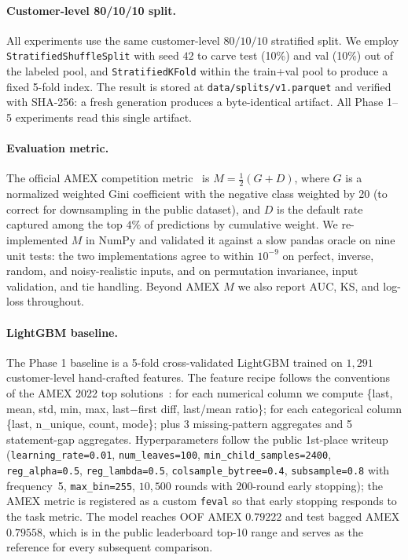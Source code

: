 \documentclass[sigconf, anonymous, review]{acmart}
\begin{document}
\paragraph{Customer-level 80/10/10 split.}
All experiments use the same customer-level $80/10/10$ stratified
split. We employ \texttt{StratifiedShuffleSplit} with seed $42$ to
carve test (10\%) and val (10\%) out of the labeled pool, and
\texttt{StratifiedKFold} within the train+val pool to produce a fixed
5-fold index. The result is stored at
\texttt{data/splits/v1.parquet} and verified with SHA-256: a fresh
generation produces a byte-identical artifact. All Phase 1--5
experiments read this single artifact.

\paragraph{Evaluation metric.}
The official AMEX competition
metric~\cite{RohanRao_metric} is
\(M = \tfrac{1}{2}(G + D)\), where $G$ is a normalized weighted Gini
coefficient with the negative class weighted by 20 (to correct for
downsampling in the public dataset), and $D$ is the default rate
captured among the top $4\%$ of predictions by cumulative weight. We
re-implemented $M$ in NumPy and validated it against a slow pandas
oracle on nine unit tests: the two implementations agree to within
$10^{-9}$ on perfect, inverse, random, and noisy-realistic inputs,
and on permutation invariance, input validation, and tie handling.
Beyond AMEX $M$ we also report AUC, KS, and log-loss throughout.

\paragraph{LightGBM baseline.}
The Phase 1 baseline is a 5-fold cross-validated LightGBM trained on
$1{,}291$ customer-level hand-crafted features. The feature recipe
follows the conventions of the AMEX 2022
top solutions~\cite{AMEX_1st_place_2022}: for each numerical column we
compute \{last, mean, std, min, max, last$-$first diff, last/mean
ratio\}; for each categorical column \{last, n\_unique, count, mode\};
plus 3 missing-pattern aggregates and 5 statement-gap aggregates.
Hyperparameters follow the public 1st-place writeup
(\texttt{learning\_rate=0.01}, \texttt{num\_leaves=100},
\texttt{min\_child\_samples=2400}, \texttt{reg\_alpha=0.5},
\texttt{reg\_lambda=0.5}, \texttt{colsample\_bytree=0.4},
\texttt{subsample=0.8} with frequency~5, \texttt{max\_bin=255},
$10{,}500$ rounds with $200$-round early stopping); the AMEX metric is
registered as a custom \texttt{feval} so that early stopping responds
to the task metric. The model reaches OOF AMEX $0.79222$ and test
bagged AMEX $0.79558$, which is in the public leaderboard top-10
range and serves as the reference for every subsequent comparison.
\end{document}
